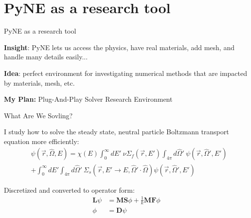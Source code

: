 \documentclass[xcolor=x11names,compress]{beamer}
\renewcommand{\(}{\begin{columns}}
\renewcommand{\)}{\end{columns}}
\newcommand{\<}[1]{\begin{column}{#1}}
\renewcommand{\>}{\end{column}}
\newcommand{\Macro}{\ensuremath{\Sigma}}
\newcommand{\vOmega}{\ensuremath{\hat{\Omega}}}
\begin{document}
\section{PyNE as a research tool}  
\begin{frame}{PyNE as a research tool}

    \textbf{Insight}: PyNE lets us access the physics, have real materials, 
    add mesh, and handle many details easily...
    
    	\pause
    \vspace{2 em}
    \textbf{Idea}: perfect environment for investigating numerical methods that 
    are impacted by materials, mesh, etc. 
    
    	\pause
    \vspace{2 em}
    \textbf{My Plan:} Plug-And-Play Solver Research Environment
    
\end{frame}

\begin{frame}{What Are We Sovling?}

    I study how to solve the steady state, neutral particle Boltzmann transport equation
    more efficiently:
    \begin{align}
    [\vOmega \cdot \nabla + \Macro(\vec{r}, E)] &\psi(\vec{r}, \vOmega, E)  = 
     \chi(E)   \int_0^{\infty} dE' \:\nu \Macro_{f}(\vec{r}, E') \int_{4\pi} d\vOmega'
     \:\psi(\vec{r}, \vOmega', E')  \nonumber \\
     &+ \int_0^{\infty} dE' \int_{4\pi} d\vOmega' \:\Macro_{s}(\vec{r}, E' \to E,
     \vOmega' \cdot \vOmega) \psi(\vec{r}, \vOmega', E')  \nonumber
    \end{align}

    Discretized and converted to operator form:
    \begin{align}
    \mathbf{L} \psi &= \mathbf{MS}\phi + \frac{1}{k}\mathbf{MF}\phi \nonumber\\
    \phi &= \mathbf{D}\psi \nonumber
    \end{align}

\end{frame}
\end{document}
